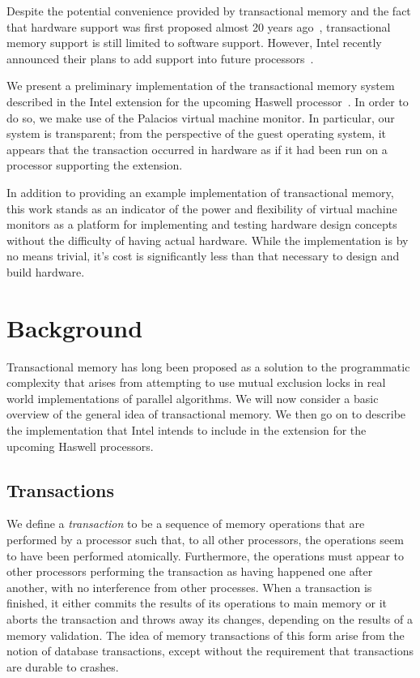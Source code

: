 \documentclass{acm_proc_article-sp}
\begin{document}
Despite the potential convenience provided by transactional memory and the fact
that hardware support was first proposed almost 20 years ago~\cite{Herlihy},
transactional memory support is still limited to software support. However,
Intel recently announced their plans to add support into future
processors~\cite{intelsys}.

We present a preliminary implementation of the transactional memory system
described in the Intel extension for the upcoming Haswell
processor~\cite{intelsys}.  In order to do so, we make use of the Palacios
virtual machine monitor. In particular, our system is transparent; from the
perspective of the guest operating system, it appears that the transaction
occurred in hardware as if it had been run on a processor supporting the
extension. 

In addition to providing an example implementation of transactional memory,
this work stands as an indicator of the power and flexibility of virtual
machine monitors as a platform for implementing and testing hardware design
concepts without the difficulty of having actual hardware. While the
implementation is by no means trivial, it's cost is significantly less than
that necessary to design and build hardware.  

\section{Background}

Transactional memory has long been proposed as a solution to the programmatic
complexity that arises from attempting to use mutual exclusion locks in real
world implementations of parallel algorithms. We will now consider a basic
overview of the general idea of transactional memory. We then go on to describe
the implementation that Intel intends to include in the extension for the
upcoming Haswell processors.

\subsection{Transactions} 

We define a \emph{transaction} to be a sequence of memory operations that are
performed by a processor such that, to all other processors, the operations
seem to have been performed atomically. Furthermore, the operations must appear
to other processors  performing the transaction as having happened one after
another, with no interference from other processes.  When a transaction is
finished, it either commits the results of its operations to main memory or it
aborts the transaction and throws away its changes, depending on the results of
a memory validation. The idea of memory transactions of this form arise from
the notion of database transactions, except without the requirement that
transactions are durable to crashes. 
\end{document}
